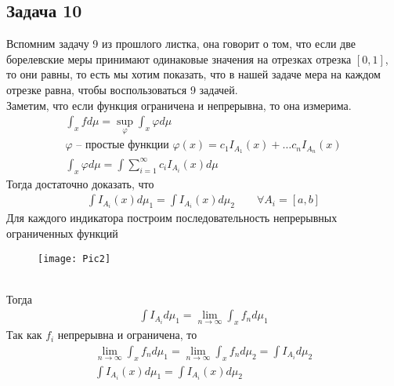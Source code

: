 \subsection*{Задача 10}
	Вспомним задачу 9 из прошлого листка, она говорит о том, что если две борелевские меры принимают одинаковые значения на отрезках отрезка $[0,1]$, то они равны, то есть мы хотим показать, что в нашей задаче мера на каждом отрезке равна, чтобы воспользоваться 9 задачей.\\
	Заметим, что если функция ограничена и непрерывна, то она измерима.
	\begin{gather*}
		\int_x f d\mu = \sup\limits_{\varphi} \int_x \varphi d \mu\\
		\varphi \text{ -- простые функции } \varphi(x) = c_1 I_{A_1}(x) + \ldots c_n I_{A_n}(x)\\
		\int_x \varphi d \mu = \int \sum\limits_{i=1}^{\infty} c_i I_{A_i}(x) d \mu 
	\end{gather*}
	Тогда достаточно доказать, что
	\begin{gather*}
		\int I_{A_i}(x) d \mu_1 = \int I_{A_i}(x) d \mu_2\qquad \forall A_i = [a,b]
	\end{gather*}
	Для каждого индикатора построим последовательность непрерывных ограниченных функций
	\begin{figure}[h]
		\texttt{[image: Pic2]}
	\end{figure}\\
	Тогда 
	\begin{gather*}
		\int I_{A_i} d\mu_1 = \lim\limits_{n \to \infty} \int_x f_n d \mu_1
	\end{gather*}
	Так как $f_i$ непрерывна и ограничена, то
	\begin{gather*}
		\lim\limits_{n \to \infty} \int_x f_n d \mu_1 = \lim\limits_{n \to \infty} \int_x f_n d \mu_2 = \int I_{A_i} d \mu_2\\
		\int I_{A_i} (x) d\mu_1 = \int I_{A_i}(x) d\mu_2
	\end{gather*}